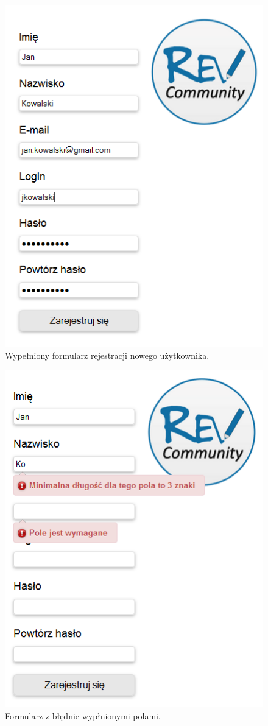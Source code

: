 \begin{figure}[h]
	\centering
	\includegraphics[scale=0.6]{images/rejestracja.png}
	\caption{Wypełniony formularz rejestracji nowego użytkownika.}
\end{figure}

\begin{figure}[h]
	\centering
	\includegraphics[scale=0.6]{images/rejestracja_walidacja.png}
	\caption{Formularz z błędnie wypłnionymi polami.}
\end{figure}

